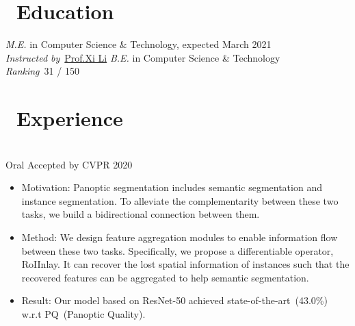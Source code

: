 \documentclass{resume}
\begin{document}

\section{\faGraduationCap\ Education}
\textit{M.E.} in  Computer Science \& Technology, expected March 2021\\
\textit{Instructed by}\ \href{https://person.zju.edu.cn/xilics}{Prof.Xi Li}
\textit{B.E.} in Computer Science \& Technology\\
\textit{Ranking}\ 31 / 150

\section{\faUsers\ Experience}
 \\
\vspace{-1em}
{Oral Accepted by CVPR 2020}
\begin{itemize}
	\item Motivation: Panoptic segmentation includes semantic segmentation and instance segmentation. To alleviate the complementarity between these two tasks, we build a bidirectional connection between them. %
	\item Method: We design feature aggregation modules to enable information flow between these two tasks. Specifically, we propose a differentiable operator, RoIInlay. It can recover the lost spatial information of instances such that the recovered features can be aggregated to help semantic segmentation. 
	\item Result: Our model based on ResNet-50 achieved state-of-the-art~(43.0\%) w.r.t PQ~(Panoptic Quality). 
\end{itemize}
\end{document}
